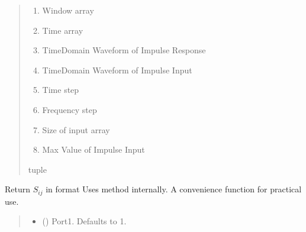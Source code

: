 \documentclass[letterpaper,10pt,english]{sphinxmanual}
\begin{document}
\begin{fulllineitems}
\begin{fulllineitems}
\begin{quote}
\begin{description}
\begin{description}
\begin{enumerate}
\item {} 
\sphinxAtStartPar
Window array

\item {} 
\sphinxAtStartPar
Time array

\item {} 
\sphinxAtStartPar
Time\sphinxhyphen{}Domain Waveform of Impulse Response

\item {} 
\sphinxAtStartPar
Time\sphinxhyphen{}Domain Waveform of Impulse Input

\item {} 
\sphinxAtStartPar
Time step

\item {} 
\sphinxAtStartPar
Frequency step

\item {} 
\sphinxAtStartPar
Size of input array

\item {} 
\sphinxAtStartPar
Max Value of Impulse Input

\end{enumerate}

\end{description}


\sphinxhyphen{}tuple

\end{description}\end{quote}

\end{fulllineitems}


\begin{fulllineitems}
\label{\detokenize{touchstone:touchstone.spfile.S}}
\pysigstartsignatures
{}
\pysigstopsignatures
\sphinxAtStartPar
Return \(S_{i j}\) in format 
Uses  method internally. A convenience function for practical use.
\begin{quote}\begin{description}
\begin{itemize}
\item {} 
\sphinxAtStartPar
{} (\sphinxstyleliteralemphasis{\sphinxupquote{, }}) \textendash{} Port\sphinxhyphen{}1. Defaults to 1.


\end{itemize}
\end{description}
\end{quote}
\end{fulllineitems}
\end{fulllineitems}
\end{document}
